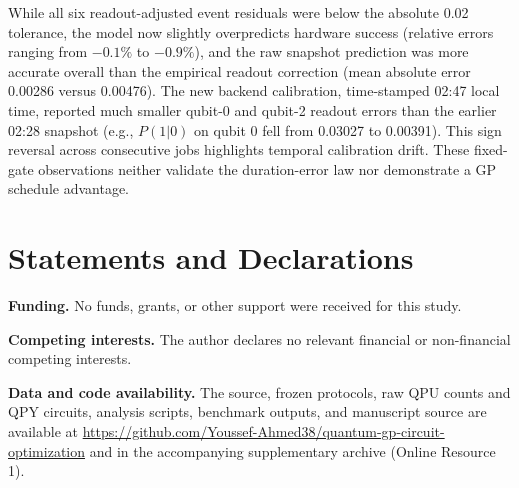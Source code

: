 \documentclass[10pt,letterpaper,journal]{IEEEtran}
\begin{document}
While all six readout-adjusted event residuals were below the absolute 0.02 tolerance, the model now slightly overpredicts hardware success (relative errors ranging from $-0.1\%$ to $-0.9\%$), and the raw snapshot prediction was more accurate overall than the empirical readout correction (mean absolute error 0.00286 versus 0.00476). The new backend calibration, time-stamped 02:47 local time, reported much smaller qubit-0 and qubit-2 readout errors than the earlier 02:28 snapshot (e.g., $P(1|0)$ on qubit 0 fell from 0.03027 to 0.00391). This sign reversal across consecutive jobs highlights temporal calibration drift. These fixed-gate observations neither validate the duration-error law nor demonstrate a GP schedule advantage.

\section*{Statements and Declarations}
\noindent\textbf{Funding.} No funds, grants, or other support were received for this study.\par
\noindent\textbf{Competing interests.} The author declares no relevant financial or non-financial competing interests.\par
\noindent\textbf{Data and code availability.} The source, frozen protocols, raw QPU counts and QPY circuits, analysis scripts, benchmark outputs, and manuscript source are available at \url{https://github.com/Youssef-Ahmed38/quantum-gp-circuit-optimization} and in the accompanying supplementary archive (Online Resource 1).\par
\end{document}
